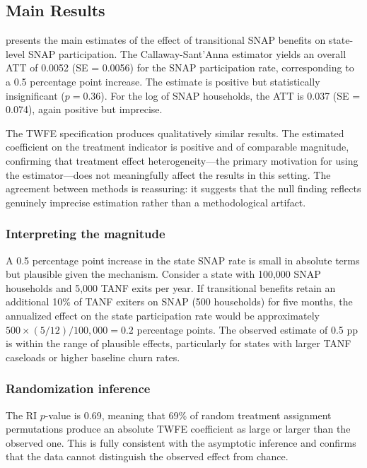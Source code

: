 \documentclass[12pt]{article}
\begin{document}
\subsection{Main Results}



 presents the main estimates of the effect of transitional SNAP benefits on state-level SNAP participation. The Callaway-Sant'Anna estimator yields an overall ATT of 0.0052 (SE = 0.0056) for the SNAP participation rate, corresponding to a 0.5 percentage point increase. The estimate is positive but statistically insignificant ($p = 0.36$). For the log of SNAP households, the ATT is 0.037 (SE = 0.074), again positive but imprecise.

The TWFE specification produces qualitatively similar results. The estimated coefficient on the treatment indicator is positive and of comparable magnitude, confirming that treatment effect heterogeneity---the primary motivation for using the \citet{callaway2021difference} estimator---does not meaningfully affect the results in this setting. The agreement between methods is reassuring: it suggests that the null finding reflects genuinely imprecise estimation rather than a methodological artifact.

\subsubsection*{Interpreting the magnitude} A 0.5 percentage point increase in the state SNAP rate is small in absolute terms but plausible given the mechanism. Consider a state with 100,000 SNAP households and 5,000 TANF exits per year. If transitional benefits retain an additional 10\% of TANF exiters on SNAP (500 households) for five months, the annualized effect on the state participation rate would be approximately $500 \times (5/12) / 100{,}000 = 0.2$ percentage points. The observed estimate of 0.5 pp is within the range of plausible effects, particularly for states with larger TANF caseloads or higher baseline churn rates.

\subsubsection*{Randomization inference} The RI $p$-value is 0.69, meaning that 69\% of random treatment assignment permutations produce an absolute TWFE coefficient as large or larger than the observed one. This is fully consistent with the asymptotic inference and confirms that the data cannot distinguish the observed effect from chance.
\end{document}
